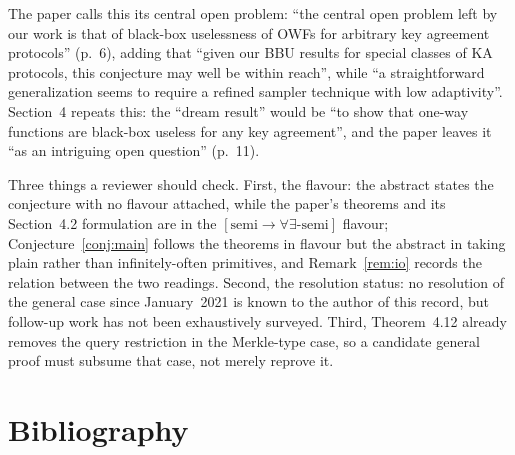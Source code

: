 \documentclass{aicr-conjecture}
\newcommand{\semibbu}{[\mathrm{semi}\to\forall\exists\text{-semi}]}
\begin{document}
\begin{remark}[openness]\label{rem:open}
The paper calls this its central open problem: ``the central open problem
left by our work is that of black-box uselessness of OWFs for arbitrary
key agreement protocols'' (p.~6), adding that ``given our BBU results for
special classes of KA protocols, this conjecture may well be within
reach'', while ``a straightforward generalization seems to require a
refined sampler technique with low adaptivity''. Section~4 repeats this:
the ``dream result'' would be ``to show that one-way functions are
black-box useless for any key agreement'', and the paper leaves it ``as
an intriguing open question'' (p.~11).
\end{remark}

\begin{remark}\label{rem:caveats}
Three things a reviewer should check. First, the flavour: the abstract
states the conjecture with no flavour attached, while the paper's
theorems and its Section~4.2 formulation are in the $\semibbu$ flavour;
Conjecture~\ref{conj:main} follows the theorems in flavour but the
abstract in taking plain rather than infinitely-often primitives, and
Remark~\ref{rem:io} records the relation between the two readings.
Second, the resolution status: no resolution of the general case since
January~2021 is known to the author of this record, but follow-up work
has not been exhaustively surveyed. Third, Theorem~4.12 already removes
the query restriction in the Merkle-type case, so a candidate general
proof must subsume that case, not merely reprove it.
\end{remark}

\section{Bibliography}
\end{document}
